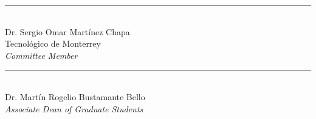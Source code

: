 \documentclass[
11pt, 
oneside,
english,
onehalfspacing,
onehalfspacing,
parskip,
headsepline,
]{MastersDoctoralThesis}
\begin{document}
\begin{committee}
\begin{flushright}
\noindent \rule[0.0em]{15em}{0.5pt}\\ %
Dr. Sergio Omar Martínez Chapa\\
Tecnológico de Monterrey\\
\emph{Committee Member}

\end{flushright}

\vfill

\begin{center}

\bigskip
\bigskip
\medskip

\noindent \rule[0.0em]{15em}{0.5pt}\\ %
Dr. Martín Rogelio Bustamante Bello \\
\emph{Associate Dean of Graduate Students}\\
\deptname\\

\bigskip
\examDate\\[0cm]

\end{center}
\end{committee}

\cleardoublepage

\end{document}
